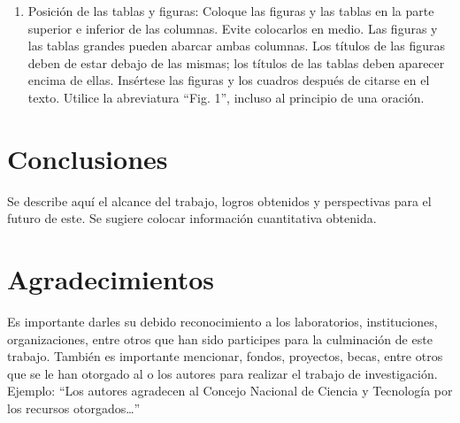     \newpage
    \label{anexo:evidenciaEnsamble.pdf}
    
    
    
    \begin{enumerate}
        \item Posición de las tablas y figuras: Coloque las figuras y las tablas en la parte superior e inferior de las columnas. Evite colocarlos en medio. Las figuras y las tablas grandes pueden abarcar ambas columnas. Los títulos de las figuras deben de estar debajo de las mismas; los títulos de las tablas deben aparecer encima de ellas. Insértese las figuras y los cuadros después de citarse en el texto. Utilice la abreviatura “Fig. 1”, incluso al principio de una oración. 
    \end{enumerate}
    
    \section{Conclusiones}
    
    Se describe aquí el alcance del trabajo, logros obtenidos y perspectivas para el futuro de este. Se sugiere colocar información cuantitativa obtenida.
    
    \section{Agradecimientos}
    
    Es importante darles su debido reconocimiento a los laboratorios, instituciones, organizaciones, entre otros que han sido participes para la culminación de este trabajo. También es importante mencionar, fondos, proyectos, becas, entre otros que se le han otorgado al o los autores para realizar el trabajo de investigación. Ejemplo: “Los autores agradecen al Concejo Nacional de Ciencia y Tecnología por los recursos otorgados…”
    
    
    

